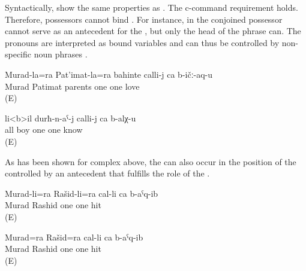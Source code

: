 Syntactically,  show the same properties as . The c-command
requirement holds. Therefore, possessors cannot bind . For instance, in  the conjoined possessor  cannot serve as an antecedent for the , but only the head of the  phrase can. The pronouns are interpreted as bound variables and can thus be controlled by non-specific noun phrases .
%
\begin{exe}
	\ex	\label{ex:Murad and Patimat's parents love each other.}
	\gll	Murad-la=ra Pat'imat-la=ra bahinte calli-j ca b-ičː-aq-u\\
		Murad	Patimat	parents	one	one	love\\
	\glt	{} (E)

	\ex	\label{ex:All boys know each other}
	\gll	li<b>il	durħ-n-aˁ-j	calli-j	ca	b-alχ-u\\
		all	 boy	one	one	know\\
	\glt	{} (E)
\end{exe}

As has been shown for complex  above, the  can also occur in the position of the   controlled by an antecedent that fulfills the role of the  . 
%
\begin{exe}
	\ex	\label{ex:‎Murad and Rashid hit each other}
	\begin{xlist}
		\ex	\label{ex:‎Murad and Rashid hit each other@A}
		\gll	Murad-li=ra	Rašid-li=ra	cal-li	ca	b-aˁq-ib\\
			Murad	Rashid	one	one	hit\\
		\glt	{} (E)
	
		\ex	\label{ex:‎Murad and Rashid hit each other@B}
		\gll	Murad=ra	Rašid=ra	cal-li	ca	b-aˁq-ib\\
			Murad\tsc{=add}	Rashid	one	one	hit\\
		\glt	{} (E)
	\end{xlist}
\end{exe}

